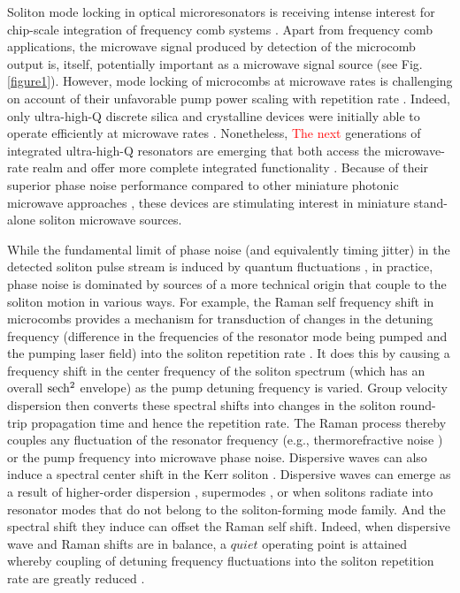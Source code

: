 \documentclass[noshowpacs,amsmath,
twocolumn,
superscriptaddress,
8pt,
aps,prb]{revtex4-2}
\begin{document}
\noindent Soliton mode locking in optical microresonators is receiving intense interest for chip-scale integration of frequency comb systems \cite{Kippenberg2018}. Apart from frequency comb applications, the microwave signal produced by detection of the microcomb output is, itself, potentially important as a microwave signal source (see Fig. \ref{figure1}). 
However, mode locking of microcombs at microwave rates is challenging on account of their unfavorable pump power scaling with repetition rate \cite{yi2015soliton}. Indeed, only ultra-high-Q discrete silica and crystalline devices were initially able to operate efficiently at microwave rates \cite{herr2014mode,yi2015soliton,liang2015high,suh2018gigahertz}. 
Nonetheless, \textcolor{red}{The next} generations of integrated ultra-high-Q resonators are emerging that both access the microwave-rate realm \cite{yang2018bridging,liu2020photonic,jin2020hertz} and offer more complete integrated functionality \cite{shen2020integrated,jin2020hertz}. Because of their superior phase noise performance compared to other miniature photonic microwave approaches \cite{li2013microwave,tang2018integrated,do2020wideband,gundavarapu2019sub}, these devices are stimulating interest in miniature stand-alone soliton microwave sources.

While the fundamental limit of phase noise (and equivalently timing jitter) in the detected soliton pulse stream is induced by quantum fluctuations \cite{matsko2013timing,bao2020quantum}, in practice, phase noise is dominated by sources of a more technical origin that couple to the soliton motion in various ways. For example, the Raman self frequency shift in microcombs \cite{yi2016theory,karpov2016raman} provides a mechanism for transduction of changes in the detuning frequency (difference in the frequencies of the resonator mode being pumped and the pumping laser field) into the soliton repetition rate \cite{yang2016spatial}. It does this by causing a frequency shift in the center frequency of the soliton spectrum (which has an overall $\rm sech^2$ envelope) as the pump detuning frequency is varied. Group velocity dispersion then converts these spectral shifts into changes in the soliton round-trip propagation time and hence the repetition rate. The Raman process thereby couples any fluctuation of the resonator frequency (e.g., thermorefractive noise \cite{gorodetsky2004fundamental,matsko2007whispering,kondratiev2018thermorefractive,huang2019thermorefractive}) or the pump frequency into microwave phase noise. Dispersive waves can also induce a spectral center shift in the Kerr soliton \cite{brasch2016photonic,yang2016spatial}. Dispersive waves can emerge as a result of higher-order dispersion \cite{Jang2014observation, brasch2016photonic}, supermodes \cite{nielsen2018invited}, or when solitons radiate into resonator modes that do not belong to the soliton-forming mode family. And the spectral shift they induce can offset the Raman self shift. Indeed, when dispersive wave and Raman shifts are in balance, a $quiet$ operating point is attained whereby coupling of detuning frequency fluctuations into the soliton repetition rate are greatly reduced \cite{yi2017single}. 
\end{document}
